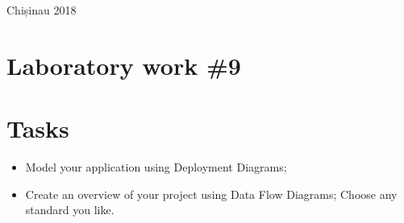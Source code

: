 \documentclass[12pt,a4paper,titlepage]{article}
\begin{document}
\begin{titlepage}
\begin{center}
      \vspace{5 mm}


      {\large Chișinau 2018}\\[3cm] %




      \vfill %
      \end{center}
      
\end{titlepage}

\cleardoublepage

\newpage

\setcounter{page}{1}
\setcounter{secnumdepth}{4}

\cleardoublepage


{}
\section*{Laboratory work \#9}

\section{Tasks}
\begin{itemize}
	\item
	Model your application using Deployment Diagrams;
	\item 
	Create an overview of your project using Data Flow Diagrams; Choose any standard
you like.
\end{itemize}
\end{document}
